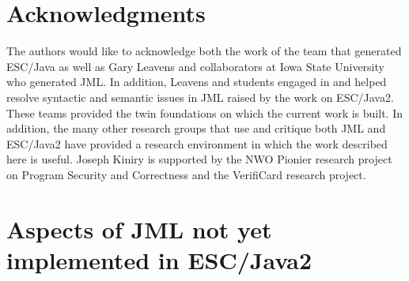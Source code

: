 \documentclass{sig-alternate}
\begin{document}

\section{Acknowledgments}
The authors would like to acknowledge both the work of the team that
generated ESC/Java as well as Gary Leavens and collaborators at Iowa
State University who generated JML.  In addition, Leavens and students
engaged in and helped resolve syntactic and semantic issues in JML
raised by the work on ESC/Java2.  These teams provided the twin
foundations on which the current work is built.  In addition, the many
other research groups that use and critique both JML and ESC/Java2
have provided a research environment in which the work described here
is useful.  Joseph Kiniry is supported by the NWO Pionier research
project on Program Security and Correctness and the VerifiCard
research project.


%

  


%
%


\appendix
\section{Aspects of JML not yet implemented in ESC/Java2}
\end{document}
